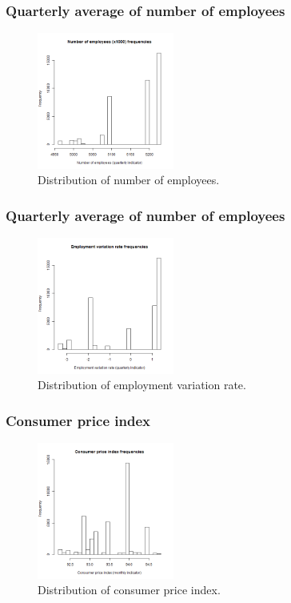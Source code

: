 \documentclass[11pt]{article}
\begin{document}
\subsubsection{Quarterly average of number of employees}
\begin{figure}[H]
	\centering
	\includegraphics[width=0.4\textwidth]{images/nr_employed}
	\caption{Distribution of number of employees.}
	\label{fig:nr_employed}
\end{figure}

\subsubsection{Quarterly average of number of employees}
\begin{figure}[H]
	\centering
	\includegraphics[width=0.4\textwidth]{images/emp_var_rate}
	\caption{Distribution of employment variation rate.}
	\label{fig:emp_var_rate}
\end{figure}

\subsubsection{Consumer price index}
\begin{figure}[H]
	\centering
	\includegraphics[width=0.4\textwidth]{images/consumer_price_index}
	\caption{Distribution of consumer price index.}
	\label{fig:cons_price_idx}
\end{figure}
\end{document}
